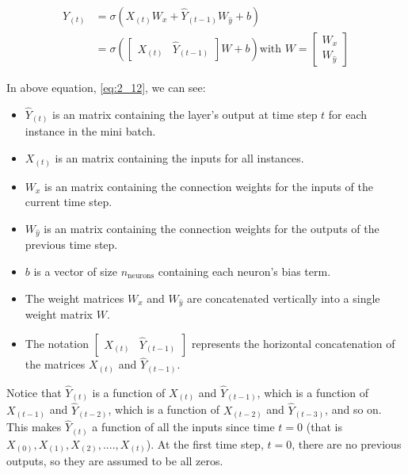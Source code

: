 \begin{equation}
    \begin{split}
    \hat{Y}_{(t)} & = \sigma \left(X_{(t)} W_x + \hat{Y}_{(t-1)} W_{\hat{y}} + b \right) \\
    & = \sigma \left(\begin{bmatrix} X_{(t)} & \hat{Y}_{(t-1)} \end{bmatrix} W + b \right) \text{with } W = \begin{bmatrix} 
    W_{x} \\
    W_{\hat{y}} 
    \end{bmatrix}
    \end{split}
    \label{eq:2_12}
\end{equation}

In above equation, \eqref{eq:2_12}, we can see:
\begin{itemize}
    \item $\hat{Y}_{(t)}$ is an  matrix containing the layer's output at time step $t$ for each instance in the mini batch.
    \item $X_{(t)}$ is an  matrix containing the inputs for all instances. 
    \item $W_{x}$ is an  matrix containing the connection weights for the inputs of the current time step.
    \item $W_{\hat{y}}$ is an  matrix containing the connection weights for the outputs of the previous time step.
    \item $b$ is a vector of size $n_{\text{neurons}}$ containing each neuron's bias term.
    \item The weight matrices $W_{x}$ and $W_{\hat{y}}$ are concatenated vertically into a single weight matrix $W$.
    \item The notation $\begin{bmatrix} X_{(t)} & \hat{Y}_{(t-1)} \end{bmatrix}$ represents the horizontal concatenation of the matrices $X_{(t)}$ and $\hat{Y}_{(t-1)}$.
\end{itemize}

Notice that $\hat{Y}_{(t)}$ is a function of $X_{(t)}$ and $\hat{Y}_{(t-1)}$, which is a function of $X_{(t-1)}$ and $\hat{Y}_{(t-2)}$, which is a function of $X_{(t-2)}$ and $\hat{Y}_{(t-3)}$, and so on. This makes $\hat{Y}_{(t)}$ a function of all the inputs since time $t = 0$ (that is $X_{(0)}, X_{(1)}, X_{(2)}, ...., X_{(t)}$). At the first time step, $t = 0$, there are no previous outputs, so they are assumed to be all zeros.






